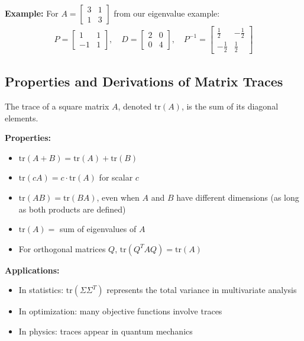 \documentclass{article}
\begin{document}
\textbf{Example:}
For $A = \begin{bmatrix} 3 & 1 \\ 1 & 3 \end{bmatrix}$ from our eigenvalue example:
\begin{align}
P = \begin{bmatrix} 
1 & 1 \\
-1 & 1
\end{bmatrix}, \quad
D = \begin{bmatrix} 
2 & 0 \\
0 & 4
\end{bmatrix}, \quad
P^{-1} = \begin{bmatrix} 
\frac{1}{2} & -\frac{1}{2} \\
-\frac{1}{2} & \frac{1}{2}
\end{bmatrix}
\end{align}

\subsection{Properties and Derivations of Matrix Traces}

The trace of a square matrix $A$, denoted $\text{tr}(A)$, is the sum of its diagonal elements.

\textbf{Properties:}
\begin{itemize}
    \item $\text{tr}(A + B) = \text{tr}(A) + \text{tr}(B)$
    \item $\text{tr}(cA) = c \cdot \text{tr}(A)$ for scalar $c$
    \item $\text{tr}(AB) = \text{tr}(BA)$, even when $A$ and $B$ have different dimensions (as long as both products are defined)
    \item $\text{tr}(A) =$ sum of eigenvalues of $A$
    \item For orthogonal matrices $Q$, $\text{tr}(Q^TAQ) = \text{tr}(A)$
\end{itemize}

\textbf{Applications:}
\begin{itemize}
    \item In statistics: $\text{tr}(\Sigma\Sigma^T)$ represents the total variance in multivariate analysis
    \item In optimization: many objective functions involve traces
    \item In physics: traces appear in quantum mechanics
\end{itemize}
\end{document}
